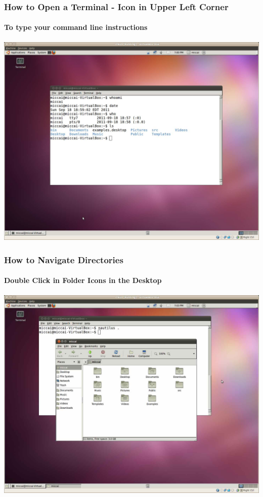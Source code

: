 \begin{frame}
\frametitle{How to Open a Terminal - Icon in Upper Left Corner}
\framesubtitle{To type your command line instructions}
\begin{center}
\includegraphics[width=0.7\paperwidth]{../Art/Screenshot-OpenTerminal.jpg}
\end{center}
\end{frame}

\begin{frame}
\frametitle{How to Navigate Directories}
\framesubtitle{Double Click in Folder Icons in the Desktop}
\begin{center}
\includegraphics[width=0.7\paperwidth]{../Art/Screenshot-Nautilus.jpg}
\end{center}
\end{frame}

